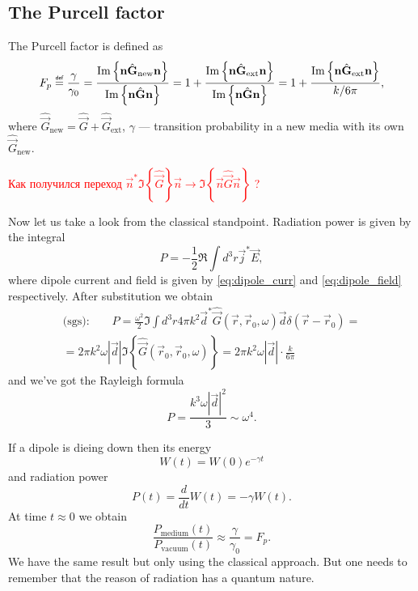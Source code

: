 \subsection{The Purcell factor}

The Purcell factor is defined as
\begin{equation}
	F_p \myeq \frac{\gamma}{\gamma_0} = \frac{\Im \left\{\vec{n} \hat{\vec{G}}_{\text{new}} \vec{n}\right\}}{\Im \left\{\vec{n} \hat{\vec{G}} \vec{n}\right\}} = 1 + \frac{\Im \left\{\vec{n} \hat{\vec{G}}_{\text{ext}} \vec{n}\right\}}{\Im \left\{\vec{n} \hat{\vec{G}} \vec{n}\right\}} = 1 + \frac{\Im \left\{\vec{n} \hat{\vec{G}}_{\text{ext}} \vec{n}\right\}}{k / 6\pi},
\end{equation}
where $\hat{\vec{G}}_{\text{new}} = \hat{\vec{G}} + \hat{\vec{G}}_{\text{ext}}$, $\gamma$ --- transition probability in a new media with its own $\hat{\vec{G}}_{\text{new}}$.

\begin{otherlanguage}{russian}	
	\textcolor{red}{Как получился переход $ \vec{n}^* \Im \left\{ \hat{\vec{G}}  \right\} \vec{n} \to \Im \left\{\vec{n} \hat{\vec{G}} \vec{n} \right\}$ ?}
\end{otherlanguage}

Now let us take a look from the classical standpoint. Radiation power is given by the integral
\begin{equation}
	P = - \frac{1}{2} \Re \int d^3 r \vec{j}^* \vec{E},
\end{equation}
where dipole current and field is given by \eqref{eq:dipole_curr} and \eqref{eq:dipole_field} respectively. After substitution we obtain
\begin{multline}
	\text{(sgs):} \qquad P = \frac{\omega^2}{2} \Im \int d^3 r 4 \pi k^2 \vec{d}^* \hat{\vec{G}}(\vec{r}, \vec{r}_0, \omega) \vec{d} \delta(\vec{r} - \vec{r}_0) =\\= 2 \pi k^2 \omega |\vec{d}| \Im \left\{ \hat{\vec{G}} (\vec{r}_0, \vec{r}_0, \omega) \right\} = 2 \pi k^2 \omega |\vec{d}| \cdot \frac{k}{6 \pi}
\end{multline}
and we've got the Rayleigh formula
\begin{equation}
	P = \frac{k^3 \omega |\vec{d}|^2}{3} \sim \omega^4.
\end{equation}

If a dipole is dieing  down then its energy
\begin{equation}
	W(t) = W(0) e^{- \gamma t}
\end{equation}
and radiation power
\begin{equation}
	P(t) = \frac{d}{dt} W(t) = - \gamma W(t).
\end{equation}
At time $t \approx 0$ we obtain
\begin{equation}
	\frac{P_{\text{medium}}(t)}{P_{\text{vacuum}}(t)} \approx \frac{\gamma}{\gamma_0} = F_p.
\end{equation}
We have the same result but only using the classical approach. But one needs to remember that the reason of radiation has a quantum nature. 